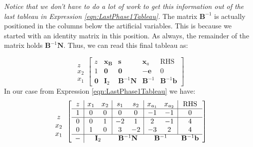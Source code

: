 \begin{example}
\textit{Notice that we don't have to do a lot of work to get this information out of the last tableau in Expression \ref{eqn:LastPhase1Tableau}.} The matrix $\mathbf{B}^{-1}$ is actually positioned in the columns below the artificial variables. This is because we started with an identity matrix in this position. As always, the remainder of the matrix holds $\mathbf{B}^{-1}\mathbf{N}$. Thus, we can read this final tableau as:

\begin{equation}
\begin{array}{c}
\\
z\\
x_{2}\\
x_{1}
\end{array}
\left[
\begin{array}{c|ccc|c}
z & \mathbf{x}_\mathbf{B} & \mathbf{s} & \mathbf{x}_a & \text{RHS}\\
\hline
1 & \mathbf{0} & \mathbf{0} & -\mathbf{e} & 0\\
\hline
\mathbf{0} & \mathbf{I}_2 & \mathbf{B}^{-1}\mathbf{N}  & \mathbf{B}^{-1} & \mathbf{B}^{-1}\mathbf{b}
\end{array}
\right]
\label{eqn:LastPhase1TableauX}
\end{equation}
In our case from Expression \ref{eqn:LastPhase1Tableau} we have:
\begin{equation}
\begin{array}{c}
\\
z\\
x_{2}\\
x_{1}
\end{array}
\left[
\begin{array}{c|cc|cc|cc|c}
z & x_1 & x_2 & s_1 & s_2 & x_{a_1} & x_{a_2} & \text{RHS}\\
\hline
1 & 0 & 0 & 0 & 0 & -1 & -1 & 0\\
\hline
0 & 0 & 1 & -2 & 1  & 2 & -1 & 4\\
0 & 1 & 0 & 3  & -2 & -3 & 2 & 4\\
\hline
- & \multicolumn{2}{c}{\mathbf{I}_2} & \multicolumn{2}{c}{\mathbf{B}^{-1}\mathbf{N}} & \multicolumn{2}{c}{\mathbf{B}^{-1}} & \mathbf{B}^{-1}\mathbf{b}
\end{array}
\right]
\end{equation}


\end{example}
